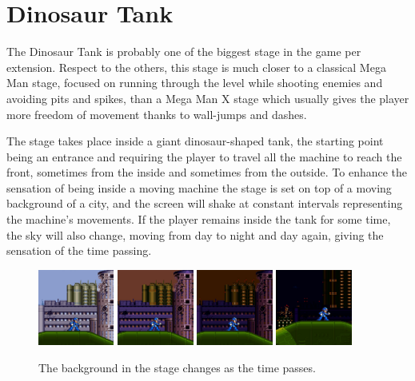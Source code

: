\section{Dinosaur Tank}
The Dinosaur Tank is probably one of the biggest stage in the game per extension. Respect to the others, this stage is much closer to a classical Mega Man stage, focused on running through the level while shooting enemies and avoiding pits and spikes, than a  Mega Man X stage which usually gives the player more freedom of movement thanks to wall-jumps and dashes.

The stage takes place inside a giant dinosaur-shaped tank, the starting point being an entrance and requiring the player to travel all the machine to reach the front, sometimes from the inside and sometimes from the outside. To enhance the sensation of being inside a moving machine the stage is set on top of a moving background of a city, and the screen will shake at constant intervals representing the machine's movements. If the player remains inside the tank for some time, the sky will also change, moving from day to night and day again, giving the sensation of the time passing.

\begin{figure}[htp]
	\centering
	\includegraphics[height=2.5cm]{figures/X2/Wheel_gator/Gator_day.jpg}
	\includegraphics[height=2.5cm]{figures/X2/Wheel_gator/Gator_day_1.jpg}
	\includegraphics[height=2.5cm]{figures/X2/Wheel_gator/Gator_day_2.jpg}
	\includegraphics[height=2.5cm]{figures/X2/Wheel_gator/Gator_day_3.jpg}
	\caption{The background in the stage changes as the time passes.}
\end{figure}

